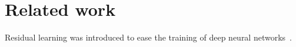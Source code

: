 \documentclass{article}
\begin{document}
\section{Related work}
Residual learning was introduced to ease the training of deep neural networks~\cite{he2016resnet}.


\end{document}
